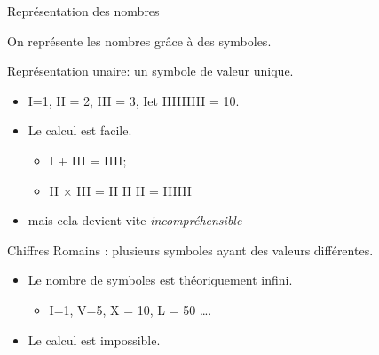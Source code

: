 \begin{frame}{Représentation des nombres}
  \begin{center}
    \alert{On représente les nombres grâce à des symboles.}
  \end{center}


  \begin{block}{Représentation unaire: un symbole de valeur unique.}
    \begin{itemize}
    \item I=1, II = 2, III = 3, Iet IIIIIIIII = 10.
    \item Le calcul est facile.
      \begin{itemize}
      \item       I + III = IIII;
      \item II $\times$ III = II II II = IIIIII
      \end{itemize}
    \item<alert@1> mais cela devient vite \emph{incompréhensible}
    \end{itemize}
  \end{block}

  \begin{block}{Chiffres Romains : plusieurs symboles ayant des valeurs différentes.}
    \begin{itemize}
    \item Le nombre de symboles est théoriquement infini.
      \begin{itemize}
      \item I=1, V=5, X = 10, L = 50 \dots.
      \end{itemize}

    \item<alert@1> Le calcul est impossible.
    \end{itemize}
  \end{block}

\end{frame}



